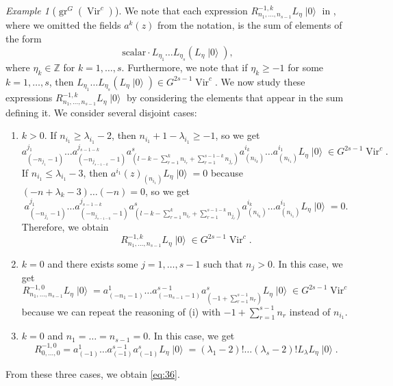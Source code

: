 \documentclass[a4paper, 12pt, reqno]{amsart}
\theoremstyle{remark}
\newtheorem{example}[theorem]{Example}
\numberwithin{equation}{subsection}
\DeclareMathOperator{\Vir}{Vir}
\DeclareMathOperator{\gr}{gr}
\DeclareMathOperator{\vac}{|0\rangle}
\begin{document}
\begin{example}[$\gr^G(\Vir^c)$]
  We note that each expression $R^{-1, k}_{n_1, \dots, n_{s - 1}}L_{\eta}\vac$ in , where we omitted the fields $a^k(z)$ from the notation, is the sum of elements of the form
  \begin{equation*}
    \text{scalar}\cdot L_{\eta_1}\dots L_{\eta_s}(L_{\eta}\vac),
  \end{equation*}
  where $\eta_k \in \mathbb{Z}$ for $k = 1, \dots, s$.
  Furthermore, we note that if $\eta_k \ge -1$ for some $k = 1, \dots, s$, then $L_{\eta_1}\dots L_{\eta_s}(L_{\eta}\vac) \in G^{2s - 1}\Vir^c$.
  We now study these expressions $R^{-1, k}_{n_1, \dots, n_{s - 1}}L_{\eta}\vac$ by considering the elements that appear in the sum defining it.
  We consider several disjoint cases:
  \begin{enumerate}
  \item $k > 0$.
    If $n_{i_1} \ge \lambda_{i_1} - 2$, then $n_{i_1} + 1 - \lambda_{i_1} \ge -1$, so we get
    \begin{equation*}
      a^{j_1}_{(-n_{j_1} - 1)}\dots a^{j_{s - 1 - k}}_{(-n_{j_{s - 1 - k}} - 1)}a^s_{(l - k - \sum_{r = 1}^kn_{i_r} + \sum_{r = 1}^{s - 1 - k}n_{j_r})}a^{i_k}_{(n_{i_k})}\dots a^{i_1}_{(n_{i_1})}L_{\eta}\vac \in G^{2s - 1}\Vir^c.
    \end{equation*}
    If $n_{i_1} \le \lambda_{i_1} - 3$, then $a^{i_1}(z)_{(n_{i_1})}L_{\eta}\vac = 0$ because $(-n + \lambda_k - 3)\dots(-n) = 0$, so we get
    \begin{equation*}
      a^{j_1}_{(-n_{j_1} - 1)}\dots a^{j_{s - 1 - k}}_{(-n_{j_{s - 1 - k}} - 1)}a^s_{(l - k - \sum_{r = 1}^kn_{i_r} + \sum_{r = 1}^{s - 1 - k}n_{j_r})}a^{i_k}_{(n_{i_k})}\dots a^{i_1}_{(n_{i_1})}L_{\eta}\vac = 0.
    \end{equation*}
    Therefore, we obtain
    \begin{equation*}
      R^{-1, k}_{n_1, \dots, n_{s - 1}}L_{\eta}\vac \in G^{2s - 1}\Vir^c.
    \end{equation*}
  \item $k = 0$ and there exists some $j = 1, \dots, s - 1$ such that $n_j > 0$.
    In this case, we get
    \begin{equation*}
      R^{-1, 0}_{n_1, \dots, n_{s - 1}}L_{\eta}\vac = a^1_{(-n_1 - 1)}\dots a^{s - 1}_{(-n_{s - 1} - 1)}a^s_{(-1 + \sum_{r = 1}^{s - 1}n_r)}L_{\eta}\vac \in G^{2s - 1}\Vir^c
    \end{equation*}
    because we can repeat the reasoning of (i) with $-1 + \sum_{r = 1}^{s - 1}n_r$ instead of $n_{i_1}$.
  \item $k = 0$ and $n_1 = \dots = n_{s - 1} = 0$.
    In this case, we get
    \begin{equation*}
      R^{-1, 0}_{0, \dots, 0} = a^1_{(-1)}\dots a^{s - 1}_{(-1)}a^s_{(-1)} L_{\eta}\vac = (\lambda_1 - 2)!\dots(\lambda_s - 2)!L_{\lambda} L_{\eta}\vac.
    \end{equation*}
  \end{enumerate}
  From these three cases, we obtain \eqref{eq:36}.


\end{example}
\end{document}
